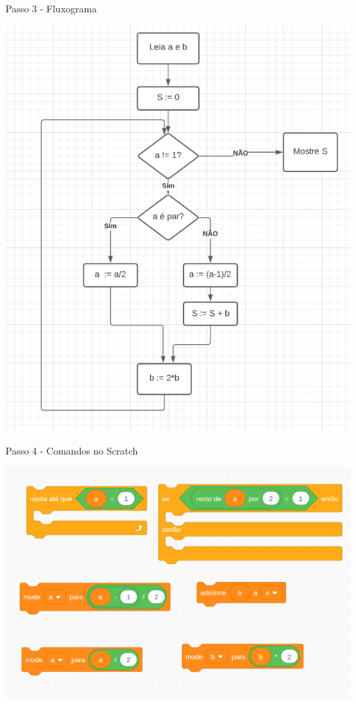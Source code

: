 \documentclass{beamer}
\begin{document}
\begin{frame}{Passo 3 - Fluxograma}



\begin{center}
	\includegraphics[scale=0.3]{images/fluxograma.png} 
\end{center}






\end{frame}


\begin{frame}{Passo 4 - Comandos no Scratch}



\begin{center}
	\includegraphics[scale=0.5]{images/multiplicacao egípcia.png} 
\end{center}

\end{frame}
\end{document}
